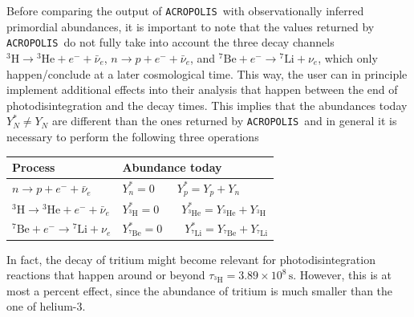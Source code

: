 \documentclass[11pt,a4paper]{article}
\newcommand{\acropolis}{\texttt{ACROPOLIS}~}
\begin{document}
Before comparing the output of \acropolis with observationally inferred primordial abundances, it is important to note that the values returned by \acropolis do not fully take into account the three decay channels ${}^3\text{H} \rightarrow {}^3\text{He} + e^- + \bar{\nu}_e$, $n\rightarrow p + e^- + \bar{\nu}_e$, and ${}^7\text{Be} + e^- \rightarrow {}^7\text{Li} +\nu_e$, which only happen/conclude at a later cosmological time. This way, the user can in principle implement additional effects into their analysis that happen between the end of photodisintegration and the decay times. This implies that the abundances today $Y_N^* \neq Y_N$ are different than the ones returned by \acropolis and in general it is necessary to perform the following three operations
\begin{center}
\begin{tabular}{|l|l|}
	\hline
	Process & Abundance today \\
	\hline
	$n\rightarrow p + e^- + \bar{\nu}_e$ & $Y_n^* = 0\qquad Y_p^* = Y_p + Y_n$ \\
	\hline
	$ {}^3\text{H} \rightarrow {}^3\text{He} + e^- + \bar{\nu}_e$ & $Y_{^3\text{H}}^* = 0\qquad\!\! Y_{^3\text{He}}^* = Y_{^3\text{He}} + Y_{^3\text{H}}$ \\
	\hline
	${}^7\text{Be} + e^- \rightarrow {}^7\text{Li} +\nu_e$ & $Y_{^7\text{Be}}^* = 0\qquad\!\!\!\! Y_{^7\text{Li}}^* = Y_{^7\text{Be}} + Y_{^7\text{Li}}$ \\
	\hline
\end{tabular}
\end{center}
In fact, the decay of tritium might become relevant for photodisintegration reactions that happen around or beyond $\tau_{^3\text{H}} = 3.89\times 10^8\,\mathrm{s}$. However, this is at most a percent effect, since the abundance of tritium is much smaller than the one of helium-3.
\end{document}
